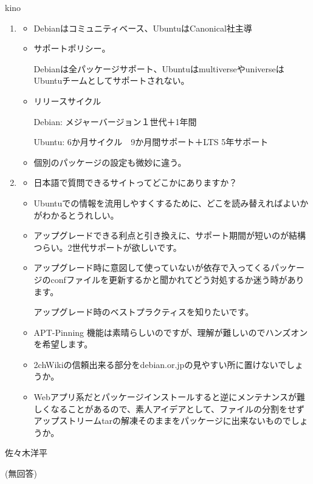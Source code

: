 \documentclass[mingoth,a4paper]{jsarticle}
\begin{document}
\begin{prework}{ kino }
  \begin{enumerate}
  \item
    \begin{itemize}
    \item Debianはコミュニティベース、UbuntuはCanonical社主導
    \item サポートポリシー。

      Debianは全パッケージサポート、UbuntuはmultiverseやuniverseはUbuntuチームとしてサポートされない。

    \item リリースサイクル

      Debian: メジャーバージョン１世代＋1年間

      Ubuntu: 6か月サイクル　9か月間サポート＋LTS 5年サポート

    \item 個別のパッケージの設定も微妙に違う。
    \end{itemize}
  \item
    \begin{itemize}
    \item 日本語で質問できるサイトってどこかにありますか？
    \item Ubuntuでの情報を流用しやすくするために、どこを読み替えればよいかがわかるとうれしい。
    \item アップグレードできる利点と引き換えに、サポート期間が短いのが結構つらい。2世代サポートが欲しいです。
    \item アップグレード時に意図して使っていないが依存で入ってくるパッケージのconfファイルを更新するかと聞かれてどう対処するか迷う時があります。

      アップグレード時のベストプラクティスを知りたいです。
    \item APT-Pinning 機能は素晴らしいのですが、理解が難しいのでハンズオンを希望します。
    \item 2chWikiの信頼出来る部分をdebian.or.jpの見やすい所に置けないでしょうか。
    \item Webアプリ系だとパッケージインストールすると逆にメンテナンスが難しくなることがあるので、素人アイデアとして、ファイルの分割をせずアップストリームtarの解凍そのままをパッケージに出来ないものでしょうか。
    \end{itemize}
  \end{enumerate}
\end{prework}

\begin{prework}{ 佐々木洋平 }

(無回答)

\end{prework}
\end{document}
